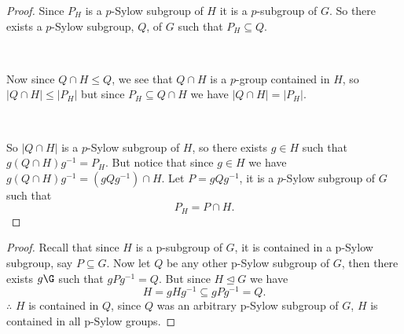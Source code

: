 \begin{exercise}
\begin{proof}
    Since $P_H$ is a $p$-Sylow subgroup of $H$ it is a $p$-subgroup of $G$. So there exists a $p$-Sylow subgroup, $Q$, of $G$ such that $P_H\subseteq Q$.
    
    \

    Now since $Q\cap H\leq Q$, we see that  $Q\cap H$ is a $p$-group contained in $H$, so  $|Q\cap H|\leq |P_H|$ but since $P_H\subseteq Q\cap H$ we have
 $|Q\cap H| = |P_H|$.

 \

 So  $|Q\cap H|$ is a $p$-Sylow subgroup of $H$, so there exists $g\in H$ such that $g(Q\cap H)g^{-1} = P_H$. But notice that since $g\in H$ we have 
 $g(Q\cap H)g^{-1} = (gQg^{-1})\cap H$. Let $P = gQg^{-1}$, it is a $p$-Sylow subgroup of $G$ such that  \[
     P_H = P\cap H
 .\]
 
\end{proof}
\end{exercise}
\begin{exercise}
    \begin{proof}       
    Recall that since $H$ is a p-subgroup of $G$, it is contained in a p-Sylow subgroup, say $P\subseteq G$.
    Now let $Q$ be any other p-Sylow subgroup of  $G$, then there exists  $g\G$ such that  $gPg^{-1} = Q$. But since $H\trianglelefteq G$ we have \[
    H = gHg^{-1}\subseteq gPg^{-1} = Q
.\]
  $\therefore$  $H$ is contained in $Q$, since $Q$ was an arbitrary p-Sylow subgroup of  $G$,  $H$ is contained in all p-Sylow groups. 

    \end{proof}
\end{exercise}
